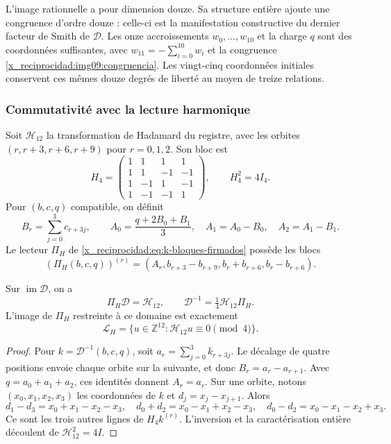 L'image rationnelle a pour dimension douze. Sa structure entière ajoute
une congruence d'ordre douze : celle-ci est la manifestation constructive du
dernier facteur de Smith de $\mathcal D$. Les onze accroissements
$w_0,\ldots,w_{10}$ et la charge $q$ sont des coordonnées suffisantes, avec
$w_{11}=-\sum_{i=0}^{10}w_i$ et la congruence
\eqref{x_reciprocidad:img09:congruencia}. Les vingt-cinq coordonnées initiales
conservent ces mêmes douze degrés de liberté au moyen de treize relations.

\subsubsection{Commutativité avec la lecture harmonique}

Soit $\mathcal H_{12}$ la transformation de Hadamard du registre,
avec les orbites $(r,r+3,r+6,r+9)$ pour $r=0,1,2$. Son bloc est
\[
 H_4=\begin{pmatrix}
 1&1&1&1\\1&1&-1&-1\\1&-1&1&-1\\1&-1&-1&1
 \end{pmatrix},\qquad H_4^2=4I_4.
\]
Pour $(b,c,q)$ compatible, on définit
\[
 B_r=\sum_{j=0}^3c_{r+3j},\qquad
 A_0=\frac{q+2B_0+B_1}{3},\quad A_1=A_0-B_0,
 \quad A_2=A_1-B_1.
\]
Le lecteur $\Pi_H$ de \eqref{x_reciprocidad:eq:k-bloques-firmados} possède les blocs
\[
 (\Pi_H(b,c,q))^{(r)}=
 (A_r,b_{r+3}-b_{r+9},b_r+b_{r+6},b_r-b_{r+6}).
\]

\begin{proposition}
\label{x_reciprocidad:img09:triangulo}
Sur $\operatorname{im}\mathcal D$, on a
\[
 \Pi_H\mathcal D=\mathcal H_{12},\qquad
 \mathcal D^{-1}=\tfrac14\mathcal H_{12}\Pi_H.
\]
L'image de $\Pi_H$ restreinte à ce domaine est exactement
\[
 \mathcal L_H=
 \{u\in\mathbb Z^{12}:\mathcal H_{12}u\equiv0\pmod4\}.
\]
\end{proposition}
\begin{proof}
Pour $k=\mathcal D^{-1}(b,c,q)$, soit
$a_r=\sum_{j=0}^3k_{r+3j}$. Le décalage de quatre positions
envoie chaque orbite sur la suivante, et donc $B_r=a_r-a_{r+1}$.
Avec $q=a_0+a_1+a_2$, ces identités donnent $A_r=a_r$.
Sur une orbite, notons $(x_0,x_1,x_2,x_3)$ les coordonnées
de $k$ et $d_j=x_j-x_{j+1}$. Alors
\[
 d_1-d_3=x_0+x_1-x_2-x_3,\quad
 d_0+d_2=x_0-x_1+x_2-x_3,\quad
 d_0-d_2=x_0-x_1-x_2+x_3.
\]
Ce sont les trois autres lignes de $H_4k^{(r)}$. L'inversion et la
caractérisation entière découlent de $\mathcal H_{12}^2=4I$.
\end{proof}

